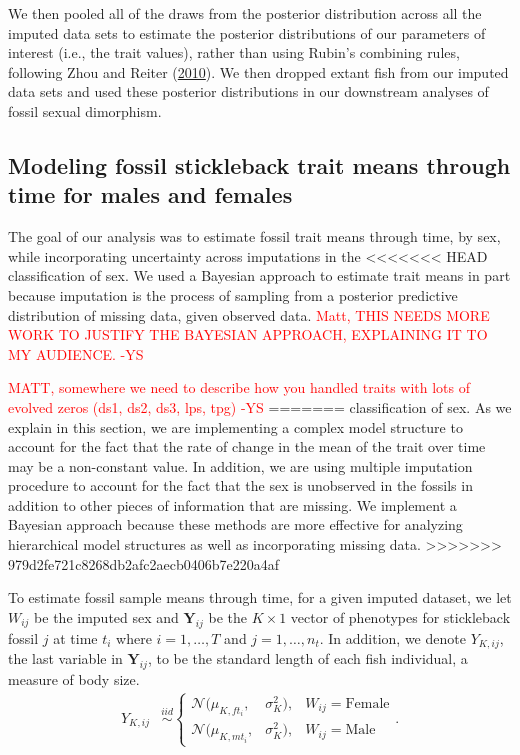 \documentclass[
  12pt,
]{article}
\begin{document}
We then pooled all of the draws from the posterior distribution across
all the imputed data sets to estimate the posterior distributions of our
parameters of interest (i.e., the trait values), rather than using
Rubin's combining rules, following Zhou and Reiter
(\protect\hyperlink{ref-ZhouReiter2010}{2010}). We then dropped extant
fish from our imputed data sets and used these posterior distributions
in our downstream analyses of fossil sexual dimorphism.

\hypertarget{modeling-fossil-stickleback-trait-means-through-time-for-males-and-females}{%
\subsection{Modeling fossil stickleback trait means through time for
males and
females}\label{modeling-fossil-stickleback-trait-means-through-time-for-males-and-females}}

The goal of our analysis was to estimate fossil trait means through
time, by sex, while incorporating uncertainty across imputations in the
<<<<<<< HEAD
classification of sex. We used a Bayesian approach to estimate trait
means in part because imputation is the process of sampling from a
posterior predictive distribution of missing data, given observed data.
\textcolor{red}{Matt, THIS NEEDS MORE WORK TO JUSTIFY THE BAYESIAN APPROACH, EXPLAINING IT TO MY AUDIENCE. -YS}

\textcolor{red}{MATT, somewhere we need to describe how you handled traits with lots of evolved zeros (ds1, ds2, ds3, lps, tpg) -YS}
=======
classification of sex. As we explain in this section, we are
implementing a complex model structure to account for the fact that the
rate of change in the mean of the trait over time may be a non-constant
value. In addition, we are using multiple imputation procedure to
account for the fact that the sex is unobserved in the fossils in
addition to other pieces of information that are missing. We implement a
Bayesian approach because these methods are more effective for analyzing
hierarchical model structures as well as incorporating missing data.
>>>>>>> 979d2fe721c8268db2afc2aecb0406b7e220a4af

To estimate fossil sample means through time, for a given imputed
dataset, we let \(W_{ij}\) be the imputed sex and
\(\boldsymbol{Y}_{ij}\) be the \(K \times 1\) vector of phenotypes for
stickleback fossil \(j\) at time \(t_i\) where \(i = 1, \ldots, T\) and
\(j = 1,\ldots,n_{t}\). In addition, we denote \(Y_{K,ij}\), the last
variable in \(\boldsymbol{Y}_{ij}\), to be the standard length of each
fish individual, a measure of body size. \begin{align}
{Y}_{K,ij} & \overset{iid}{\sim}\left\{\begin{array}{lll} \mathcal{N}(\mu_{K,ft_i},&\sigma_{K}^2), & W_{ij} = \text{Female} \\ \mathcal{N}(\mu_{K,mt_i},&\sigma_{K}^2), & W_{ij} = \text{Male} \end{array}\right..
\label{eq:stl}
\end{align}
\end{document}
